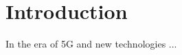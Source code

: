 \chapter{Introduction} \label{Intro:chap:chap1}
\graphicspath{{10.Chapter1/Images/}}



In the era of 5G and new technologies ...